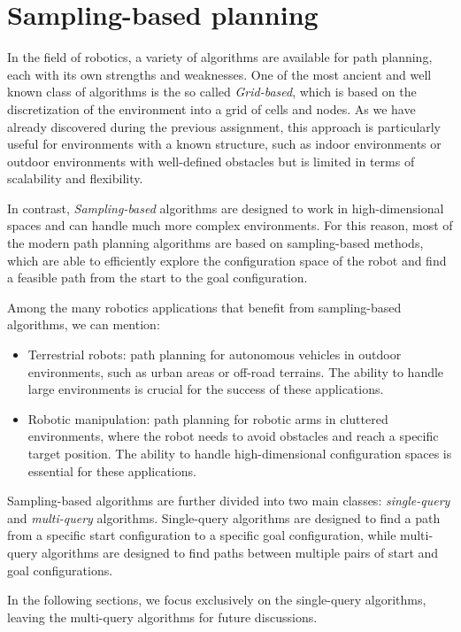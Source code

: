 \section{Sampling-based planning}
\label{sec:sampling_based_planning}

In the field of robotics, a variety of algorithms are available for path planning, each with its own strengths and weaknesses.
One of the most ancient and well known class of algorithms is the so called \textit{Grid-based}, which is based on the discretization of the environment into a grid of cells and nodes.
As we have already discovered during the previous assignment, this approach is particularly useful for environments with a known structure, such as indoor environments or outdoor environments with well-defined obstacles but is limited in terms of scalability and flexibility.

In contrast, \textit{Sampling-based} algorithms are designed to work in high-dimensional spaces and can handle much more complex environments.
For this reason, most of the modern path planning algorithms are based on sampling-based methods, which are able to efficiently explore the configuration space of the robot and find a feasible path from the start to the goal configuration.

Among the many robotics applications that benefit from sampling-based algorithms, we can mention:

\begin{itemize}
    \item Terrestrial robots: path planning for autonomous vehicles in outdoor environments, such as urban areas or off-road terrains. The ability to handle large environments is crucial for the success of these applications.
    \item Robotic manipulation: path planning for robotic arms in cluttered environments, where the robot needs to avoid obstacles and reach a specific target position. The ability to handle high-dimensional configuration spaces is essential for these applications.
\end{itemize}

Sampling-based algorithms are further divided into two main classes: \textit{single-query} and \textit{multi-query} algorithms.
Single-query algorithms are designed to find a path from a specific start configuration to a specific goal configuration, while multi-query algorithms are designed to find paths between multiple pairs of start and goal configurations.

In the following sections, we focus exclusively on the single-query algorithms, leaving the multi-query algorithms for future discussions.


